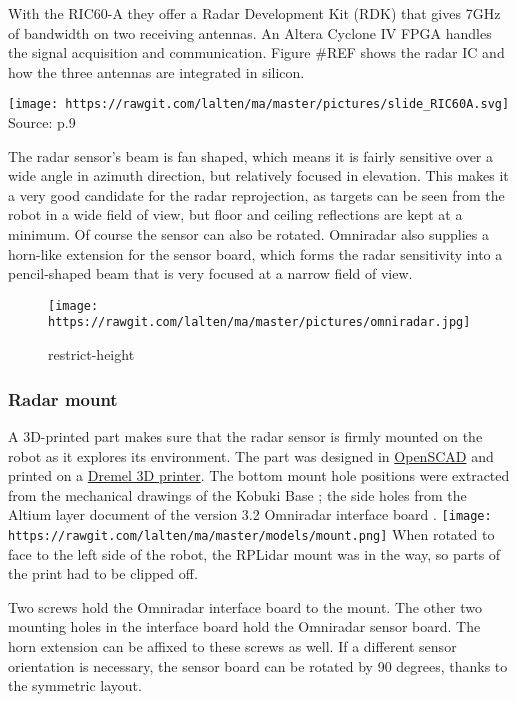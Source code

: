 With the RIC60-A they offer a Radar Development Kit (RDK) that gives
7GHz of bandwidth on two receiving antennas. An Altera Cyclone IV FPGA
handles the signal acquisition and communication. Figure \#REF shows the
radar IC and how the three antennas are integrated in silicon.

\texttt{[image: https://rawgit.com/lalten/ma/master/pictures/slide\_RIC60A.svg]}
Source: \cite{Brouwer2015} p.9

The radar sensor's beam is fan shaped, which means it is fairly
sensitive over a wide angle in azimuth direction, but relatively focused
in elevation. This makes it a very good candidate for the radar
reprojection, as targets can be seen from the robot in a wide field of
view, but floor and ceiling reflections are kept at a minimum. Of course
the sensor can also be rotated. Omniradar also supplies a horn-like
extension for the sensor board, which forms the radar sensitivity into a
pencil-shaped beam that is very focused at a narrow field of view.

\begin{figure}
\centering
\texttt{[image: https://rawgit.com/lalten/ma/master/pictures/omniradar.jpg]}
\caption{restrict-height}
\end{figure}

\subsubsection{Radar mount}\label{radar-mount}

A 3D-printed part makes sure that the radar sensor is firmly mounted on
the robot as it explores its environment. The part was designed in
\href{http://www.openscad.org/}{OpenSCAD} and printed on a
\href{https://3dprinter.dremel.com/}{Dremel 3D printer}. The bottom
mount hole positions were extracted from the mechanical drawings of the
Kobuki Base \cite{YujinRobot2012}; the side holes from the Altium layer
document of the version 3.2 Omniradar interface board
\cite{Omniradar2014}.
\texttt{[image: https://rawgit.com/lalten/ma/master/models/mount.png]}
When rotated to face to the left side of the robot, the RPLidar mount
was in the way, so parts of the print had to be clipped off.

Two screws hold the Omniradar interface board to the mount. The other
two mounting holes in the interface board hold the Omniradar sensor
board. The horn extension can be affixed to these screws as well. If a
different sensor orientation is necessary, the sensor board can be
rotated by 90 degrees, thanks to the symmetric layout.

